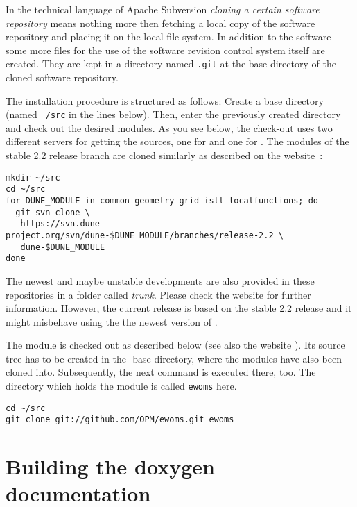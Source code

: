 In the technical language of Apache Subversion \emph{cloning a certain
  software repository} means nothing more then fetching a local copy
of the software repository and placing it on the local file system.
In addition to the software some more files for the use of the
software revision control system itself are created. They are kept in
a directory named \texttt{.git} at the base directory of the cloned
software repository.

The installation procedure is structured as follows: Create a {\Dune} base
directory (named \texttt{~/src} in the lines below).  Then, enter the
previously created directory and check out the desired modules.  As
you see below, the check-out uses two different servers for getting
the sources, one for \Dune and one for \eWoms.  The \Dune modules of
the stable 2.2 release branch are cloned similarly as described on the
\Dune website~\cite{DUNE-DOWNLOAD-SVN}:

\begin{lstlisting}[style=Bash]
mkdir ~/src
cd ~/src
for DUNE_MODULE in common geometry grid istl localfunctions; do
  git svn clone \
   https://svn.dune-project.org/svn/dune-$DUNE_MODULE/branches/release-2.2 \
   dune-$DUNE_MODULE
done
\end{lstlisting}

The newest and maybe unstable developments are also provided in these
repositories in a folder called \emph{trunk}. Please check the \Dune
website \cite{DUNE-DOWNLOAD-SVN} for further information. However, the
current \eWoms release is based on the stable 2.2 \Dune release and it
might misbehave using the the newest version of \Dune.

The \eWoms module is checked out as described below (see also the
\eWoms website \cite{EWOMS-HP}).  Its source tree has to be created in
the \Dune-base directory, where the \Dune modules have also been
cloned into. Subsequently, the next command is executed there,
too. The directory which holds the \eWoms module is called
\texttt{ewoms} here.

\begin{lstlisting}[style=Bash]
cd ~/src
git clone git://github.com/OPM/ewoms.git ewoms
\end{lstlisting}

\section{Building the doxygen documentation}
\label{sec:build-doxy-doc}

